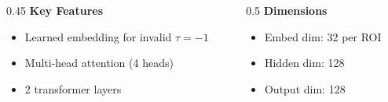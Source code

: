 \documentclass[aspectratio=169,9pt]{beamer}
\begin{document}
\begin{frame}
\begin{center}
\begin{tikzpicture}[node distance=0.5cm, scale=0.8, transform shape]
\end{tikzpicture}
\end{center}

\vspace{0.2cm}

\begin{columns}[T]
\begin{column}{0.45\textwidth}
\textbf{\small Key Features}
\begin{itemize}\setlength{\itemsep}{1pt}
    \item[\tiny$\bullet$] \footnotesize Learned embedding for invalid $\tau = -1$
    \item[\tiny$\bullet$] \footnotesize Multi-head attention (4 heads)
    \item[\tiny$\bullet$] \footnotesize 2 transformer layers
\end{itemize}
\end{column}

\begin{column}{0.5\textwidth}
\textbf{\small Dimensions}
\begin{itemize}\setlength{\itemsep}{1pt}
    \item[\tiny$\bullet$] \footnotesize Embed dim: 32 per ROI
    \item[\tiny$\bullet$] \footnotesize Hidden dim: 128
    \item[\tiny$\bullet$] \footnotesize Output dim: 128
\end{itemize}
\end{column}
\end{columns}
\end{frame}
\end{document}
